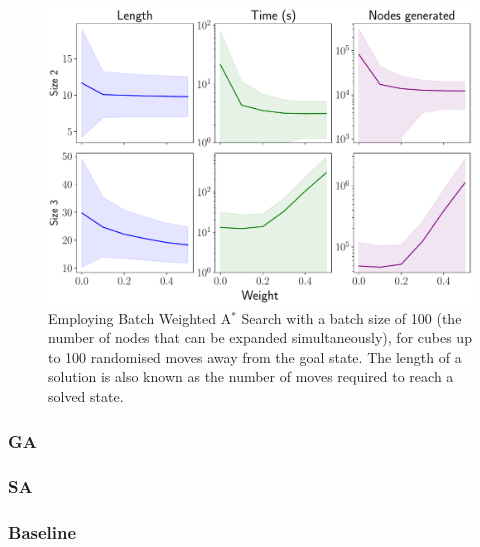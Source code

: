 \documentclass[UKenglish]{svproc}
\begin{document}
\begin{figure}[!h]
\begin{small}
\centering
\linespread{1.0}
\includegraphics[width=0.75\linewidth]{images/bwas}
\caption{Employing Batch Weighted A$^{\ast}$ Search with a batch size of 100 (the number of nodes that can be expanded simultaneously), for cubes up to 100 randomised moves away from the goal state. The length of a solution is also known as the number of moves required to reach a solved state.}
\label{fig:fig3}
\end{small}
\end{figure}

\subsubsection{GA}


\subsubsection{SA}


\subsubsection{Baseline}
\end{document}
